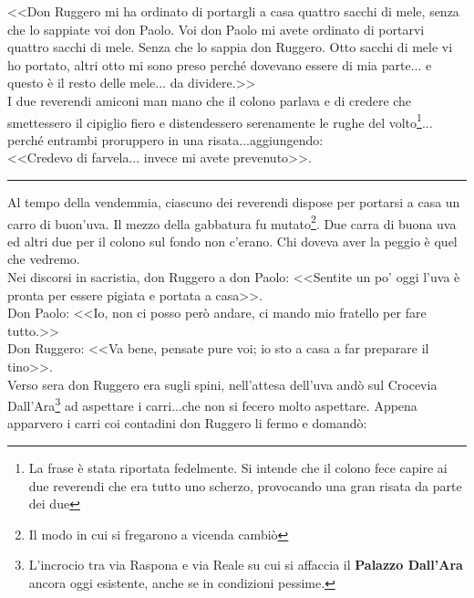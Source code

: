 \indent <<Don Ruggero mi ha ordinato di portargli a casa quattro sacchi di mele, senza che lo sappiate voi don Paolo. Voi don Paolo mi avete ordinato di portarvi quattro sacchi di mele. Senza che lo sappia don Ruggero. Otto sacchi di mele vi ho portato, altri otto mi sono preso perché dovevano essere di mia parte... e questo è il resto delle mele... da dividere.>>\\
\indent I due reverendi amiconi man mano che il colono parlava e di credere che smettessero il cipiglio fiero e distendessero serenamente le rughe del volto\footnote{La frase è stata riportata fedelmente. Si intende che il colono fece capire ai due reverendi che era tutto uno scherzo, provocando una gran risata da parte dei due}... perché entrambi proruppero in una risata...aggiungendo: \\
\indent <<Credevo di farvela... invece mi avete prevenuto>>.
\begin{center}
\rule{1.5cm}{0.4pt}
\end{center}
Al tempo della vendemmia, ciascuno dei reverendi dispose per portarsi a casa un carro di buon'uva. Il mezzo della gabbatura fu mutato\footnote{Il modo in cui si fregarono a vicenda cambiò}. Due carra di buona uva ed altri due per il colono sul fondo non c'erano. Chi doveva aver la peggio è quel che vedremo. \\
\indent Nei discorsi in sacristia, don Ruggero a don Paolo: 
<<Sentite un po' oggi l'uva è pronta per essere pigiata e portata a casa>>.\\
\indent Don Paolo: <<Io, non ci posso però andare, ci mando mio fratello per fare tutto.>>\\
\indent Don Ruggero: <<Va bene, pensate pure voi; io sto a casa a far preparare il tino>>.\\
\indent Verso sera don Ruggero era sugli spini, nell'attesa dell'uva andò sul Crocevia Dall'Ara\footnote{L'incrocio tra via Raspona e via Reale su cui si affaccia il \textbf{Palazzo Dall'Ara} ancora oggi esistente, anche se in condizioni pessime. } ad aspettare i carri...che non si fecero molto aspettare. Appena apparvero i carri coi contadini don Ruggero li fermo e domandò: \\
